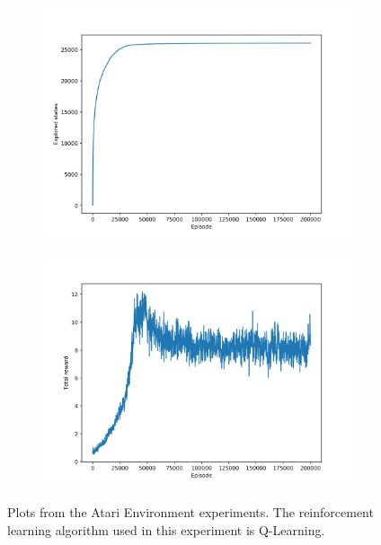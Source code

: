 \begin{figure}
\begin{subfigure}[h]{0.5\linewidth}
\includegraphics[width=\linewidth]{images/atari-ql-explored-states.png}
\end{subfigure}
\hfill
\begin{subfigure}[h]{0.5\linewidth}
\includegraphics[width=\linewidth]{images/atari-ql-total-reward.png}
\end{subfigure}
\caption{Plots from the Atari Environment experiments. The reinforcement learning algorithm used in this experiment is Q-Learning.}
\end{figure}
